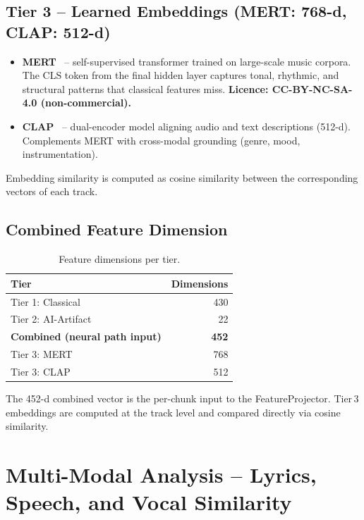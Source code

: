 \documentclass[11pt,a4paper]{article}
\begin{document}
\subsection{Tier 3 -- Learned Embeddings (MERT: 768-d, CLAP: 512-d)}

\begin{itemize}[nosep]
  \item \textbf{MERT}~\cite{A2} -- self-supervised transformer trained on large-scale music corpora. The CLS token from the final hidden layer captures tonal, rhythmic, and structural patterns that classical features miss. \textbf{Licence: CC-BY-NC-SA-4.0 (non-commercial).}
  \item \textbf{CLAP}~\cite{A3} -- dual-encoder model aligning audio and text descriptions (512-d). Complements MERT with cross-modal grounding (genre, mood, instrumentation).
\end{itemize}

Embedding similarity is computed as cosine similarity between the corresponding vectors of each track.

\subsection{Combined Feature Dimension}

\begin{table}[H]
\centering
\begin{tabular}{lr}
\toprule
\textbf{Tier} & \textbf{Dimensions} \\
\midrule
Tier 1: Classical & 430 \\
Tier 2: AI-Artifact & 22 \\
\textbf{Combined (neural path input)} & \textbf{452} \\
Tier 3: MERT & 768 \\
Tier 3: CLAP & 512 \\
\bottomrule
\end{tabular}
\caption{Feature dimensions per tier.}
\end{table}

The 452-d combined vector is the per-chunk input to the FeatureProjector. Tier\,3 embeddings are computed at the track level and compared directly via cosine similarity.


\section{Multi-Modal Analysis -- Lyrics, Speech, and Vocal Similarity}
\end{document}
